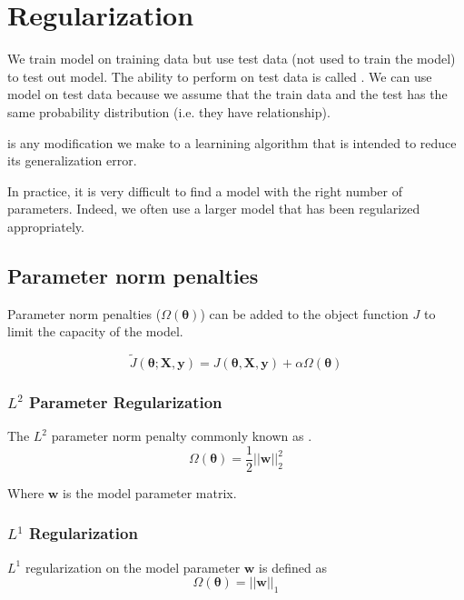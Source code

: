 
\chapter{Regularization}
\label{cha:regularization}

We train model on training data but use test data (not used to train the model) to test out model.
The ability to perform on test data is called .
We can use model on test data because we assume that the train data and the test has the same probability distribution (i.e. they have relationship).


 is any modification we make to a learnining algorithm that is intended to reduce its generalization error.

In practice, it is very difficult to find a model with the right number of parameters.
Indeed, we often use a larger model that has been regularized appropriately.
\section{Parameter norm penalties}
\label{sec:param-norm-penalt}


Parameter norm penalties ($\Omega(\bm{\theta})$) can be added to the object function \(J\) to limit the capacity of the model.

\begin{equation}
  \label{eq:norm-penalties}
  \tilde{J}(\bm{\theta;X,y}) = J(\bm{\theta,X,y}) + \alpha \Omega(\bm{\theta})
\end{equation}


\subsection{$L^2$ Parameter Regularization}

The $L^2$ parameter norm penalty commonly known as .
\begin{equation}
  \label{eq:12}
  \Omega(\bm{\theta}) = \frac{1}{2} ||\bm{w}||_2^2
\end{equation}

Where \(\bm{w}\) is the model parameter matrix.

\subsection{$L^1$ Regularization}

$L^1$ regularization on the model parameter $\bm{w}$ is defined as
\begin{equation}
  \label{eq:l1}
  \Omega(\bm{\theta}) = ||\bm{w}||_1
\end{equation}

